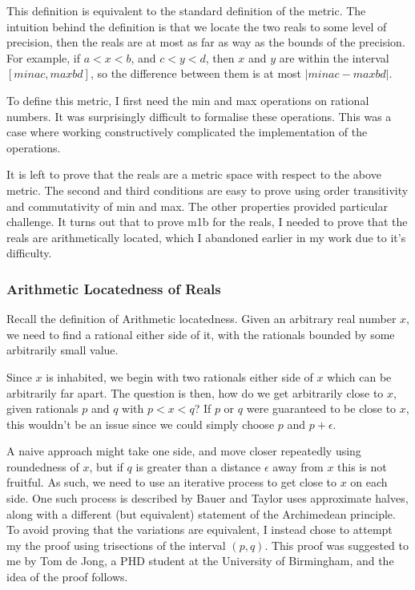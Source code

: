 \documentclass[ProjectReport]{subfiles}
\begin{document}

This definition is equivalent to the standard definition of the metric. The intuition behind the definition is that we locate the two reals to some level of precision, then the reals are at most as far as way as the bounds of the precision. For example, if $a < x < b$, and $c < y < d$, then $x$ and $y$ are within the interval $[min a c , max b d]$, so the difference between them is at most $| min a c - max b d |$.

To define this metric, I first need the min and max operations on rational numbers. It was surprisingly difficult to formalise these operations. This was a case where working constructively complicated the implementation of the operations. 



It is left to prove that the reals are a metric space with respect to the above metric. The second and third conditions are easy to prove using order transitivity and commutativity of min and max. The other properties provided particular challenge. It turns out that to prove m1b for the reals, I needed to prove that the reals are arithmetically located, which I abandoned earlier in my work due to it's difficulty.

\subsubsection{Arithmetic Locatedness of Reals}

Recall the definition of Arithmetic locatedness. Given an arbitrary real number $x$, we need to find a rational either side of it, with the rationals bounded by some arbitrarily small value.

Since $x$ is inhabited, we begin with two rationals either side of $x$ which can be arbitrarily far apart. The question is then, how do we get arbitrarily close to $x$, given rationals $p$ and $q$ with $p < x < q$? If $p$ or $q$ were guaranteed to be close to $x$, this wouldn't be an issue since we could simply choose $p$ and $p + \epsilon$.

A naive approach might take one side, and move closer repeatedly using roundedness of $x$, but if $q$ is greater than a distance $\epsilon$ away from $x$ this is not fruitful. As such, we need to use an iterative process to get close to $x$ on each side. One such process is described by Bauer and Taylor \cite[Proposition 11.15]{bauer_taylor_2009} uses approximate halves, along with a different (but equivalent) statement of the Archimedean principle. To avoid proving that the variations are equivalent, I instead chose to attempt my the proof using trisections of the interval $(p,q)$. This proof was suggested to me by Tom de Jong, a PHD student at the University of Birmingham, and the idea of the proof follows.
\end{document}
